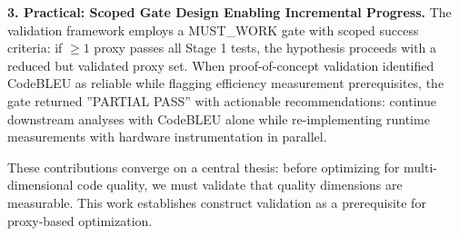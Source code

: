 \textbf{3. Practical: Scoped Gate Design Enabling Incremental Progress.} The validation framework employs a MUST\_WORK gate with scoped success criteria: if $\geq 1$ proxy passes all Stage 1 tests, the hypothesis proceeds with a reduced but validated proxy set. When proof-of-concept validation identified CodeBLEU as reliable while flagging efficiency measurement prerequisites, the gate returned ''PARTIAL PASS'' with actionable recommendations: continue downstream analyses with CodeBLEU alone while re-implementing runtime measurements with hardware instrumentation in parallel.

These contributions converge on a central thesis: before optimizing for multi-dimensional code quality, we must validate that quality dimensions are measurable. This work establishes construct validation as a prerequisite for proxy-based optimization.
